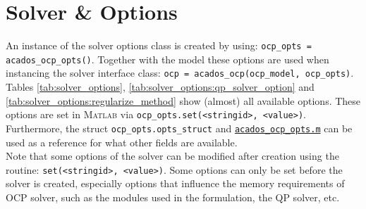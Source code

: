 \documentclass[english]{article}
\newcommand{\code}[1]{\texttt{#1}}
\newcommand{\matlab}{\textsc{Matlab}}
\begin{document}
\section{Solver \& Options}\label{sec:solver}
%
An instance of the solver options class is created by using: \code{ocp\_opts = acados\_ocp\_opts()}.
Together with the model these options are used when instancing the solver interface class: \code{ocp = acados\_ocp(ocp\_model, ocp\_opts)}.\\
Tables \ref{tab:solver_options}, \ref{tab:solver_options:qp_solver_option} and \ref{tab:solver_options:regularize_method} show (almost) all available options.
These options are set in \matlab{} via \code{ocp\_opts.set(<stringid>, <value>)}.
Furthermore, the struct \code{ocp\_opts.opts\_struct} and \href{https://github.com/acados/acados/blob/master/interfaces/acados_matlab_octave/acados_ocp_opts.m}{\code{acados\_ocp\_opts.m}} can be used as a reference for what other fields are available.
\\
Note that some options of the solver can be modified after creation using the routine: \code{set(<stringid>, <value>)}.
Some options can only be set before the solver is created, especially options that influence the memory requirements of OCP solver, such as the modules used in the formulation, the QP solver, etc.
\end{document}
